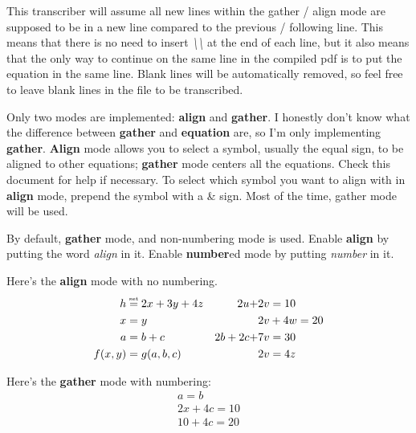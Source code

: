 \documentclass[12pt]{article}
\newcommand{\pytexset}{\mathrel{\stackrel{\makebox[0pt]{\mbox{\normalfont\tiny set}}}{=}}}
\begin{document}
\medskip

This transcriber will assume all new lines within the gather / align mode are supposed to be in a new line compared to the previous / following line. This means that there is no need to insert \emph{\textbackslash\textbackslash} at the end of each line, but it also means that the only way to continue on the same line in the compiled pdf is to put the equation in the same line. Blank lines will be automatically removed, so feel free to leave blank lines in the file to be transcribed.

\medskip

Only two modes are implemented: \textbf{align} and \textbf{gather}. I honestly don't know what the difference between \textbf{gather} and \textbf{equation} are, so I'm only implementing \textbf{gather}. \textbf{Align} mode allows you to select a symbol, usually the equal sign, to be aligned to other equations; \textbf{gather} mode centers all the equations. Check this document for help if necessary. To select which symbol you want to align with in \textbf{align} mode, prepend the symbol with a \& sign. Most of the time, gather mode will be used.

\medskip

By default, \textbf{gather} mode, and non-numbering mode is used. Enable \textbf{align} by putting the word \emph{align} in it. Enable \textbf{number}ed mode by putting \emph{number} in it.

\medskip

Here's the \textbf{align} mode with no numbering.
\begin{align*}
h &\pytexset 2x + 3y + 4z		&	2u + &2v = 10 \\
x &= y						&	&2v + 4w = 20 \\
a &= b + c					&	2b + 2c + &7v = 30\\
f(x, y) &= g(a, b, c)		&	&2v = 4z 
\end{align*}

\medskip

Here's the \textbf{gather} mode with numbering:
\begin{gather}
a = b \\
2x + 4c = 10 \\
10 + 4c = 20 
\end{gather}
\end{document}
